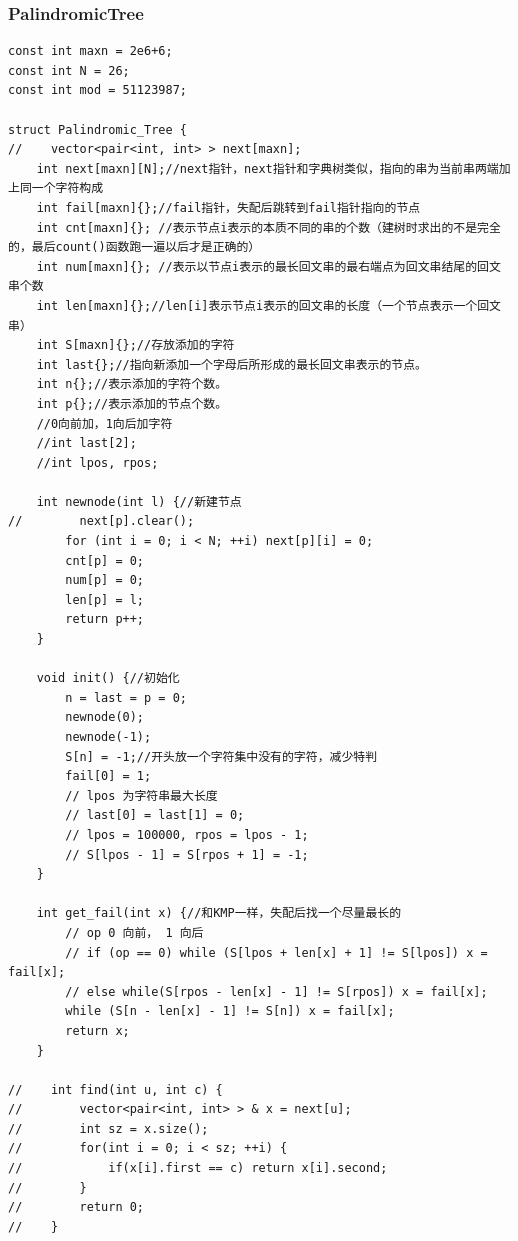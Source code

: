 \documentclass[twoside]{article}
\begin{document}
\subsubsection{PalindromicTree}
\begin{lstlisting}
const int maxn = 2e6+6;
const int N = 26;
const int mod = 51123987;

struct Palindromic_Tree {
//    vector<pair<int, int> > next[maxn];
    int next[maxn][N];//next指针，next指针和字典树类似，指向的串为当前串两端加上同一个字符构成
    int fail[maxn]{};//fail指针，失配后跳转到fail指针指向的节点
    int cnt[maxn]{}; //表示节点i表示的本质不同的串的个数（建树时求出的不是完全的，最后count()函数跑一遍以后才是正确的）
    int num[maxn]{}; //表示以节点i表示的最长回文串的最右端点为回文串结尾的回文串个数
    int len[maxn]{};//len[i]表示节点i表示的回文串的长度（一个节点表示一个回文串）
    int S[maxn]{};//存放添加的字符
    int last{};//指向新添加一个字母后所形成的最长回文串表示的节点。
    int n{};//表示添加的字符个数。
    int p{};//表示添加的节点个数。
    //0向前加，1向后加字符
    //int last[2];
    //int lpos, rpos;

    int newnode(int l) {//新建节点
//        next[p].clear();
        for (int i = 0; i < N; ++i) next[p][i] = 0;
        cnt[p] = 0;
        num[p] = 0;
        len[p] = l;
        return p++;
    }

    void init() {//初始化
        n = last = p = 0;
        newnode(0);
        newnode(-1);
        S[n] = -1;//开头放一个字符集中没有的字符，减少特判
        fail[0] = 1;
        // lpos 为字符串最大长度
        // last[0] = last[1] = 0;
        // lpos = 100000, rpos = lpos - 1;
        // S[lpos - 1] = S[rpos + 1] = -1;
    }

    int get_fail(int x) {//和KMP一样，失配后找一个尽量最长的
        // op 0 向前， 1 向后
        // if (op == 0) while (S[lpos + len[x] + 1] != S[lpos]) x = fail[x];
        // else while(S[rpos - len[x] - 1] != S[rpos]) x = fail[x];
        while (S[n - len[x] - 1] != S[n]) x = fail[x];
        return x;
    }

//    int find(int u, int c) {
//        vector<pair<int, int> > & x = next[u];
//        int sz = x.size();
//        for(int i = 0; i < sz; ++i) {
//            if(x[i].first == c) return x[i].second;
//        }
//        return 0;
//    }


\end{lstlisting}
\end{document}
